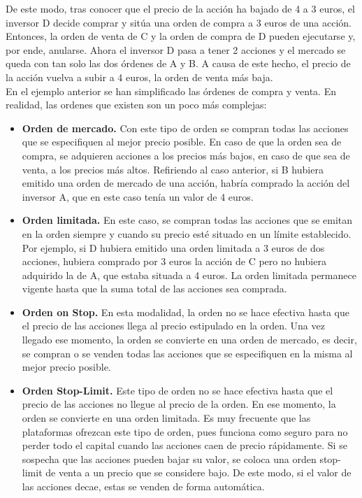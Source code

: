 		
		De este modo, tras conocer que el precio de la acci\'on ha bajado de 4 a 3 euros, el inversor D decide comprar y sit\'ua una orden de compra a 3 euros de una acci\'on. Entonces, la orden de venta de C y la orden de compra de D pueden ejecutarse y, por ende, anularse. Ahora el inversor D pasa a tener 2 acciones y el mercado se queda con tan solo las dos \'ordenes de A y B. A causa de este hecho, el precio de la acci\'on vuelva a subir a 4 euros, la orden de venta m\'as baja.\\
		
		En el ejemplo anterior se han simplificado las \'ordenes de compra y venta. En realidad, las ordenes que existen son un poco m\'as complejas:\\
		
		\begin{itemize}
			
			\item \textbf{Orden de mercado.} Con este tipo de orden se compran todas las acciones que se especifiquen al mejor precio posible. En caso de que la orden sea de compra, se adquieren acciones a los precios m\'as bajos, en caso de que sea de venta, a los precios m\'as altos. Refiriendo al caso anterior, si B hubiera emitido una orden de mercado de una acci\'on, habría comprado la acci\'on del inversor A, que en este caso ten\'ia un valor de 4 euros.
			
			\item \textbf{Orden limitada.} En este caso, se compran todas las acciones que se emitan en la orden siempre y cuando su precio est\'e situado en un l\'imite establecido. Por ejemplo, si D hubiera emitido una orden limitada a 3 euros de dos acciones, hubiera comprado por 3 euros la acci\'on de C pero no hubiera adquirido la de A, que estaba situada a 4 euros. La orden limitada permanece vigente hasta que la suma total de las acciones sea comprada.
			
			\item \textbf{Orden on Stop.} En esta modalidad, la orden no se hace efectiva hasta que el precio de las acciones llega al precio estipulado en la orden. Una vez llegado ese momento, la orden se convierte en una orden de mercado, es decir, se compran o se venden todas las acciones que se especifiquen en la misma al mejor precio posible.
			
			\item \textbf{Orden Stop-Limit.} Este tipo de orden no se hace efectiva hasta que el precio de las acciones no llegue al precio de la orden. En ese momento, la orden se convierte en una orden limitada. Es muy frecuente que las plataformas ofrezcan este tipo de orden, pues funciona como seguro para no perder todo el capital cuando las acciones caen de precio r\'apidamente. Si se sospecha que las acciones pueden bajar su valor, se coloca una orden stop-limit de venta a un precio que se considere bajo. De este modo, si el valor de las acciones decae, estas se venden de forma autom\'atica. 
			
		\end{itemize} 
		
